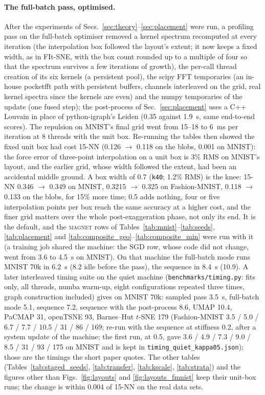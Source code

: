 \documentclass[11pt]{article}
\newcommand{\magnet}{\textsc{magnet}}
\begin{document}
\paragraph{The full-batch pass, optimised.} After the experiments of Secs.~\ref{sec:theory}--\ref{sec:placement}
were run, a profiling pass on the full-batch optimiser removed a kernel spectrum recomputed at every
iteration (the interpolation box followed the layout's extent; it now keeps a fixed width, as in FIt-SNE,
with the box count rounded up to a multiple of four so that the spectrum survives a few iterations of
growth), the per-call thread creation of its six kernels (a persistent pool), the scipy FFT temporaries (an
in-house pocketfft path with persistent buffers, channels interleaved on the grid, real kernel spectra since
the kernels are even) and the numpy temporaries of the update (one fused step); the post-process of
Sec.~\ref{sec:placement} uses a C++ Louvain in place of python-igraph's Leiden (0.35 against 1.9~s, same
end-to-end scores). The repulsion on MNIST's final grid went from 15--18 to 6~ms per iteration at 8 threads
with the unit box. Re-running the tables then showed the fixed unit box had cost 15-NN (0.126 $\to$ 0.118 on
the blobs, 0.001 on MNIST): the force error of three-point interpolation on a unit box is 3\% RMS on
MNIST's layout, and the earlier grid, whose width followed the extent, had been an accidental middle
ground. A box width of 0.7 (\texttt{k40}; 1.2\% RMS) is the knee: 15-NN 0.346 $\to$ 0.349 on MNIST,
0.3215 $\to$ 0.325 on Fashion-MNIST, 0.118 $\to$ 0.133 on the blobs, for 15\% more time; 0.5 adds
nothing, four or five interpolation points per box reach the same accuracy at a higher cost, and the
finer grid matters over the whole post-exaggeration phase, not only its end. It is the default, and the
\magnet{} rows of Tables~\ref{tab:mnist}--\ref{tab:seeds}, \ref{tab:placement} and
\ref{tab:composite_geo}--\ref{tab:composite_min} were run with it (a training job shared the machine:
the SGD row, whose code did not change, went from 3.6 to 4.5~s on MNIST). On that machine the full-batch mode
runs MNIST 70k in 6.2~s (8.2 idle before the pass), the sequence in 8.4~s (10.9). A later interleaved timing suite
on the quiet machine (\texttt{benchmarks/timing.py}: fits only, all threads, numba warm-up, eight configurations
repeated three times, graph construction included) gives on MNIST 70k: sampled pass 3.5~s, full-batch mode 5.1,
sequence 7.2, sequence with the post-process 8.6, UMAP 10.4, PaCMAP 31, openTSNE 93, Barnes--Hut $t$-SNE 179
(Fashion-MNIST 3.5 / 5.0 / 6.7 / 7.7 / 10.5 / 31 / 86 / 169; re-run with the sequence at stiffness 0.2, after a
system update of the machine; the first run, at 0.5, gave 3.6 / 4.9 / 7.3 / 9.0 / 8.5 / 31 / 93 / 175 on MNIST and is
kept in \texttt{timing\_quiet\_kappa05.json}); those are the timings the short paper quotes. The other tables
(Tables~\ref{tab:staged_seeds}, \ref{tab:transfer}, \ref{tab:kscale}, \ref{tab:strata}) and the figures other
than Figs.~\ref{fig:layouts} and \ref{fig:layouts_fmnist} keep their unit-box runs; the change is within
0.004 of 15-NN on the real data sets.
\end{document}
